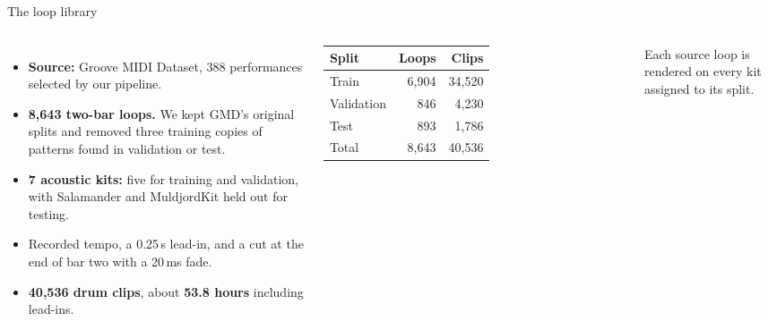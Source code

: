 \begin{frame}{The loop library}

  \begin{columns}[T,onlytextwidth]
      \small
      \begin{itemize}
        \item \textbf{Source:} Groove MIDI Dataset,
          388 performances selected by our pipeline.

        \item \textbf{8,643 two-bar loops.}
          We kept GMD's original splits and removed three
          training copies of patterns found in validation or test.

        \item \textbf{7 acoustic kits:}
          five for training and validation, with Salamander
          and MuldjordKit held out for testing.

        \item Recorded tempo, a 0.25\,s lead-in,
          and a cut at the end of bar two with a 20\,ms fade.

        \item \textbf{40,536 drum clips}, about
          \textbf{53.8 hours} including lead-ins.
      \end{itemize}

      \centering
      \small
      \begin{tabular}{lrr}
        \hline
        \textbf{Split} & \textbf{Loops} & \textbf{Clips} \\
        \hline
        Train      & 6,904 & 34,520 \\
        Validation &   846 &  4,230 \\
        Test       &   893 &  1,786 \\
        \hline
        Total      & 8,643 & 40,536 \\
        \hline
      \end{tabular}

      \vspace{0.4cm}
      {\footnotesize
        Each source loop is rendered on every kit
        assigned to its split.
      }
  \end{columns}

\end{frame}

